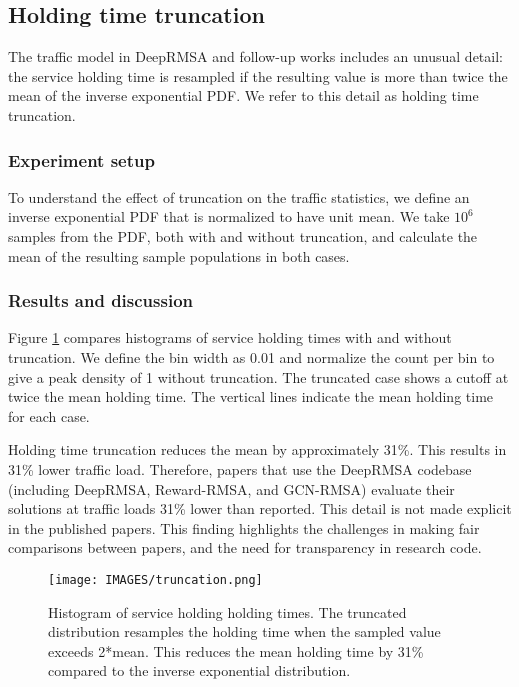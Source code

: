 



\subsection{Holding time truncation}
\label{sec:holding_time}

The traffic model in DeepRMSA and follow-up works includes an unusual detail: the service holding time is resampled if the resulting value is more than twice the mean of the inverse exponential PDF. We refer to this detail as holding time truncation. 


\subsubsection{Experiment setup}
To understand the effect of truncation on the traffic statistics, we define an inverse exponential PDF that is normalized to have unit mean. We take $10^{6}$ samples from the PDF, both with and without truncation, and calculate the mean of the resulting sample populations in both cases.

\subsubsection{Results and discussion}
Figure \ref{fig:truncation} compares histograms of service holding times with and without truncation. We define the bin width as 0.01 and normalize the count per bin to give a peak density of 1 without truncation. The truncated case shows a cutoff at twice the mean holding time. The vertical lines indicate the mean holding time for each case.

Holding time truncation reduces the mean by approximately 31\%. This results in 31\% lower traffic load. Therefore, papers that use the DeepRMSA codebase (including DeepRMSA, Reward-RMSA, and GCN-RMSA) evaluate their solutions at traffic loads 31\% lower than reported. This detail is not made explicit in the published papers. This finding highlights the challenges in making fair comparisons between papers, and the need for transparency in research code.

\begin{figure}
    \centering
    \texttt{[image: IMAGES/truncation.png]}
    \caption{Histogram of service holding holding times. The truncated distribution resamples the holding time when the sampled value exceeds 2*mean. This reduces the mean holding time by 31\% compared to the inverse exponential distribution.}
    \label{fig:truncation}
\end{figure}






